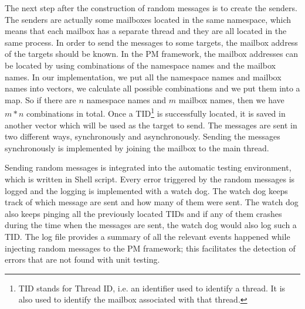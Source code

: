 The next step after the construction of random messages is %
to create the senders. The senders are actually some mailboxes located in the same namespace, which means that each mailbox has a separate thread and they are all located in the same process. In order to send the messages to some targets, the mailbox address of the targets should be known. In the PM framework, the mailbox addresses can be located by using combinations of the namespace names and the mailbox names. In our implementation, we put all the namespace names and mailbox names into vectors, we calculate 
all possible combinations and we put them into a map.  %
So if there are $n$ namespace names and $m$ mailbox names, then we have $m*n$ combinations in total. Once a TID\footnote{TID stands for Thread ID, i.e. an identifier used to identify a thread. It is also used to identify the mailbox associated with that thread.} is successfully located, it is saved in another vector which will be used as the target to send. The messages are sent in two different ways, synchronously and asynchronously. Sending the messages synchronously is  implemented by joining the mailbox to the main thread.  

%

Sending random messages is integrated into the automatic testing environment, which is written in Shell script. Every error triggered by the random messages is logged and the logging is implemented with a watch dog. The watch dog keeps track of which message are sent and how many of them were sent. The watch dog also keeps pinging all the previously located TIDs and if any of them crashes during the time when the messages are sent, the watch dog would also log such a TID. The log file provides a summary of all the relevant events happened while injecting random messages to the PM framework; this facilitates the detection of errors that are not found with unit testing.

